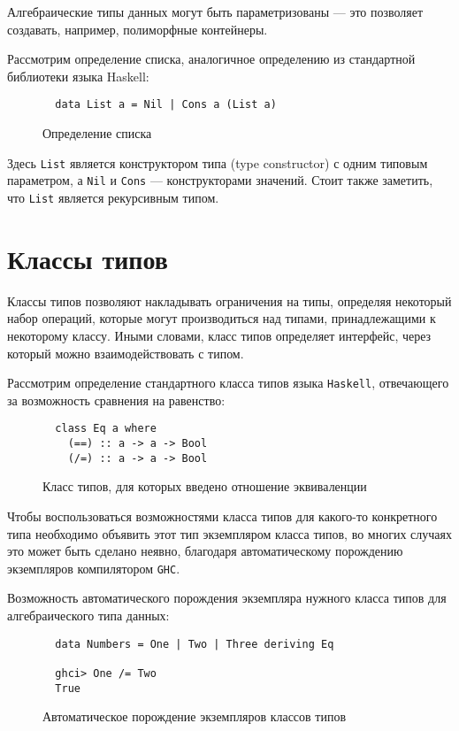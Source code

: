   Алгебраические типы данных могут быть параметризованы --- это позволяет
  создавать, например, полиморфные контейнеры.

  Рассмотрим определение списка, аналогичное определению из стандартной библиотеки
  языка Haskell:

  \begin{figure}[h]
  \begin{lstlisting}
  data List a = Nil | Cons a (List a)
  \end{lstlisting}
  \caption{Определение списка}
  \label{listing:List}
  \end{figure}

  Здесь \lstinline{List} является конструктором типа (type constructor) с одним
  типовым параметром, а \lstinline{Nil} и \lstinline{Cons} --- конструкторами
  значений. Стоит также заметить, что \lstinline{List} является рекурсивным типом.

\section{Классы типов}

  Классы типов позволяют накладывать ограничения на типы, определяя некоторый
  набор операций, которые могут производиться над типами, принадлежащими к
  некоторому классу. Иными словами, класс типов определяет интерфейс,
  через который можно взаимодействовать с типом.

  Рассмотрим определение стандартного класса типов языка \lstinline{Haskell},
  отвечающего за возможность сравнения на равенство:

  \begin{figure}[h]
  \begin{lstlisting}
  class Eq a where
    (==) :: a -> a -> Bool
    (/=) :: a -> a -> Bool
  \end{lstlisting}
  \caption{Класс типов, для которых введено отношение эквиваленции}
  \label{listing:Eq}
  \end{figure}

  Чтобы воспользоваться возможностями класса типов для какого-то конкретного типа
  необходимо объявить этот тип экземпляром класса типов, во многих случаях это
  может быть сделано неявно, благодаря автоматическому порождению экземпляров
  компилятором \lstinline{GHC}.

  Возможность автоматического порождения экземпляра нужного класса типов для
  алгебраического типа данных:
  \begin{figure}[h]
  \begin{lstlisting}
  data Numbers = One | Two | Three deriving Eq

  ghci> One /= Two
  True
  \end{lstlisting}
  \caption{Автоматическое порождение экземпляров классов типов}
  \label{listing:List}
  \end{figure}


